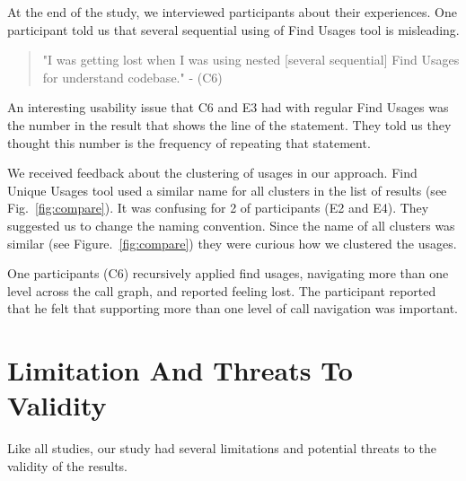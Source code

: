 \documentclass[conference]{IEEEtran}
\begin{document}
At the end of the study, we interviewed  participants about their experiences. One participant told us that several sequential using of Find Usages tool is misleading.
\begin{quote} "I was getting lost when I was using nested [several sequential] Find Usages for understand codebase." - (C6)\end{quote}

 An interesting usability issue that C6 and E3 had with regular Find Usages was the number in the result that shows the line of the statement. They told us they thought this number is the frequency of repeating that statement.\par
 
We received feedback about the clustering of usages in our approach. Find Unique Usages tool used a similar name for all clusters in the list of results (see Fig.~\ref{fig:compare}). It was confusing for 2 of participants (E2 and E4). They suggested us to change the naming convention. Since the name of all clusters was similar (see Figure.~\ref{fig:compare}) they were curious how we clustered the usages.\par

One participants (C6) recursively applied find usages, navigating more than one level across the call graph, and reported feeling lost. The participant reported that he felt that supporting more than one level of call navigation was important. 




\section{Limitation And Threats To Validity}
Like all studies, our study had several limitations and potential threats to the validity of the results. \par  
\end{document}
